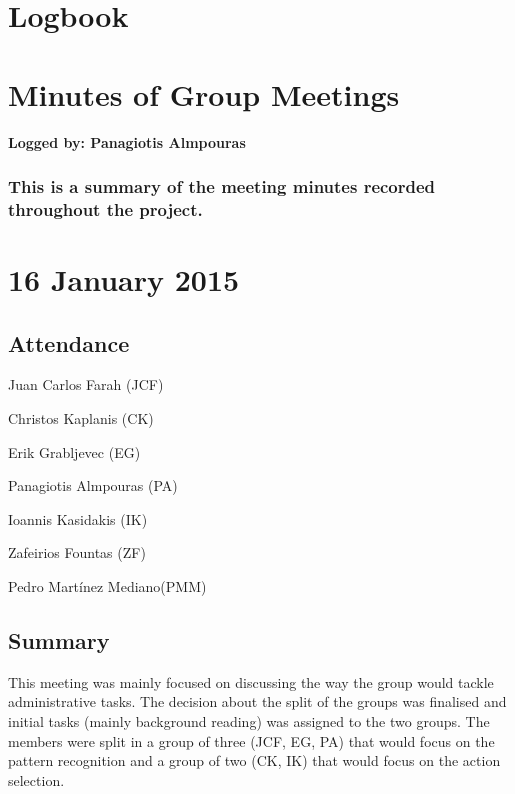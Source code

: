 \documentclass[a4paper,11pt]{article}
\begin{document}
\section{Logbook}

\clearpage
\section{Minutes of Group Meetings}
\textbf{Logged by: Panagiotis Almpouras}
\subsubsection*{This is a summary of the meeting minutes recorded throughout the project.}
\maketitle
\section*{16 January 2015}
\subsection*{Attendance}
\begin{compactenum}
\item Juan Carlos Farah (JCF)
\item Christos Kaplanis (CK)
\item Erik Grabljevec (EG)
\item Panagiotis Almpouras (PA)
\item Ioannis Kasidakis (IK)
\item Zafeirios Fountas (ZF)
\item Pedro Martínez Mediano(PMM)
\end{compactenum}

\subsection*{Summary}
This meeting was mainly focused on discussing the way the group would tackle administrative tasks. The decision about the split of the groups was finalised and initial tasks (mainly background reading) was assigned to the two groups. The members were split in a group of three (JCF, EG, PA) that would focus on the pattern recognition and a group of two (CK, IK) that would focus on the action selection.

\maketitle
\end{document}
